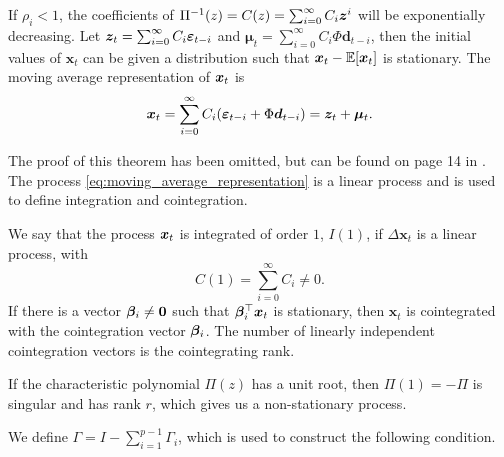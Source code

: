 \begin{thm}{\hfill}
    \noindent If $\rho_i<1$, the coefficients of $\Pi^{-1}(z)=C(z)=\sum_{i=0}^\infty C_i\boldsymbol{z}^i$ will be exponentially decreasing. Let $\boldsymbol{z}_t=\sum_{i=0}^\infty C_i\boldsymbol{\varepsilon}_{t-i}$ and $\boldsymbol{\mu}_t=\sum_{i=0}^\infty C_i\Phi \boldsymbol{d}_{t-i}$, then the initial values of $\boldsymbol{x}_t$ can be given a distribution such that $\boldsymbol{x}_t - \mathbb{E}[\boldsymbol{x}_t]$ is stationary. The moving average representation of $\boldsymbol{x}_t$ is 
    \begin{equation}
        \boldsymbol{x}_t=\sum_{i=0}^\infty C_i(\boldsymbol{\varepsilon}_{t-i}+\Phi \boldsymbol{d}_{t-i})=\boldsymbol{z}_t + \boldsymbol{\mu}_t.
        \label{eq:moving_average_representation}
    \end{equation}
\end{thm}
\noindent The proof of this theorem has been omitted, but can be found on page 14 in \cite{Likelihood-based-inference-book}.\\
\noindent The process \eqref{eq:moving_average_representation} is a linear process and is used to define integration and cointegration.
\begin{defi}{\hfill}
    We say that the process $\boldsymbol{x}_t$ is integrated of order $1$, $I(1)$, if $\Delta \boldsymbol{x}_t$ is a linear process, with 
    \begin{equation*}
        C(1) = \sum^\infty_{i=0} C_i \neq 0.
    \end{equation*}
    If there is a vector $\boldsymbol{\beta}_i \neq \boldsymbol{0}$ such that $\boldsymbol{\beta}_i^\top \boldsymbol{x}_t$ is stationary, then $\boldsymbol{x}_t$ is cointegrated with the cointegration vector $\boldsymbol{\beta}_i$. The number of linearly independent cointegration vectors is the cointegrating rank.
\end{defi}

\noindent If the characteristic polynomial $\Pi(z)$ has a unit root, then $\Pi(1)=-\Pi$ is singular and has rank $r$, which gives us a non-stationary process. 

\noindent
We define $\Gamma=I-\sum_{i=1}^{p-1}\Gamma_i$, which is used to construct the following condition.


